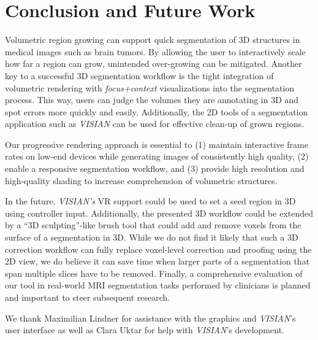 \documentclass[sigconf]{acmart}
\begin{document}
\section{Conclusion and Future Work}
Volumetric region growing can support quick segmentation of 3D structures in medical images such as brain tumors. 
By allowing the user to interactively scale how far a region can grow, unintended over-growing can be mitigated.
Another key to a successful 3D segmentation workflow is the tight integration of volumetric rendering with \emph{focus+context} visualizations into the segmentation process. 
This way, users can judge the volumes they are annotating in 3D and spot errors more quickly and easily.
Additionally, the 2D tools of a segmentation application such as \emph{VISIAN} can be used for effective clean-up of grown regions.

Our progressive rendering approach is essential to
(1) maintain interactive frame rates on low-end devices while generating images of consistently high quality, %
(2) enable a responsive segmentation workflow, and %
(3) provide high resolution and high-quality shading to increase comprehension of volumetric structures.

In the future, \emph{VISIAN's} VR support could be used to set a seed region in 3D using controller input. 
Additionally, the presented 3D workflow could be extended by a \enquote{3D sculpting}-like brush tool that could add and remove voxels from the surface of a segmentation in 3D. While we do not find it likely that such a 3D correction workflow can fully replace voxel-level correction and proofing using the 2D view, we do believe it can save time when larger parts of a segmentation that span multiple slices have to be removed.
Finally, a comprehensive evaluation of our tool in real-world MRI segmentation tasks performed by clinicians is planned and important to steer subsequent research.

\begin{acks}
    We thank Maximilian Lindner for assistance with the graphics and \emph{VISIAN}'s user interface as well as Clara Uktar for help with \emph{VISIAN}'s development.
\end{acks}

\balance 


\end{document}
